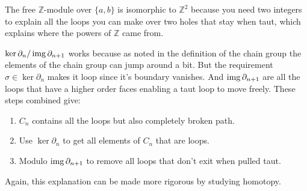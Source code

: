 The free $\mathbb{Z}$-module over $\{a,b\}$ is isomorphic to $\mathbb{Z}^2$ because you need two integers to explain all the loops you can make over two holes that stay when taut,
which explains where the powers of $\mathbb{Z}$ came from.

$\ker\partial_n / \operatorname{img}\partial_{n+1}$ works because as noted in the definition of the chain group the elements of the chain group can jump around a bit.
But the requirement $\sigma\in\ker\partial_n$ makes it loop since it's boundary vanishes.
And $\operatorname{img}\partial_{n+1}$ are all the loops that have a higher order faces enabling a taut loop to move freely.
These steps combined give:
\begin{enumerate}
	\item $C_n$ contains all the loops but also completely broken path.
	\item Use $\ker\partial_n$ to get all elements of $C_n$ that are loops.
	\item Modulo $\operatorname{img}\partial_{n+1}$ to remove all loops that don't exit when pulled taut.
\end{enumerate}
\mbox 
Again, this explanation can be made more rigorous by studying homotopy.
